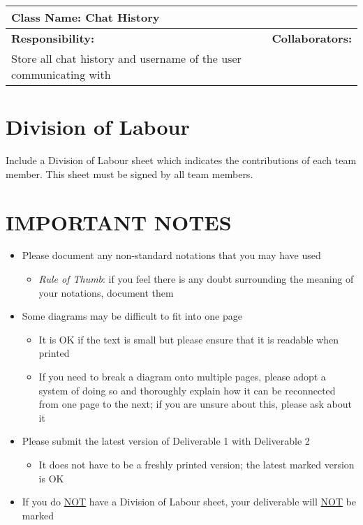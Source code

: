\documentclass[]{article}
\begin{document}
\begin{table}[H]
    \centering
    \begin{tabular}{|p{5cm}|p{5cm}|}
        \hline
        \multicolumn{2}{|l|}{\textbf{Class Name:} Chat History}\\
        \hline
        \textbf{Responsibility:} & \textbf{Collaborators:}\\
        \hline
        Store all chat history and username of the user communicating with  & ~\\
        \hline
    \end{tabular}
\end{table}

\newpage
\appendix
\section{Division of Labour}
\label{sec:division_of_labour}
Include a Division of Labour sheet which indicates the contributions of each team member. This sheet must be signed by all team members.

\newpage
\section*{IMPORTANT NOTES}
\begin{itemize}
	\item Please document any non-standard notations that you may have used
	\begin{itemize}
		\item \emph{Rule of Thumb}: if you feel there is any doubt surrounding the meaning of your notations, document them
	\end{itemize}
	\item Some diagrams may be difficult to fit into one page
	\begin{itemize}
		\item It is OK if the text is small but please ensure that it is readable when printed
		\item If you need to break a diagram onto multiple pages, please adopt a system of doing so and thoroughly explain how it can be reconnected from one page to the next; if you are unsure about this, please ask about it
	\end{itemize}
	\item Please submit the latest version of Deliverable 1 with Deliverable 2
	\begin{itemize}
		\item It does not have to be a freshly printed version; the latest marked version is OK
	\end{itemize}
	\item If you do \underline{NOT} have a Division of Labour sheet, your deliverable will \underline{NOT} be marked
\end{itemize}
\end{document}
